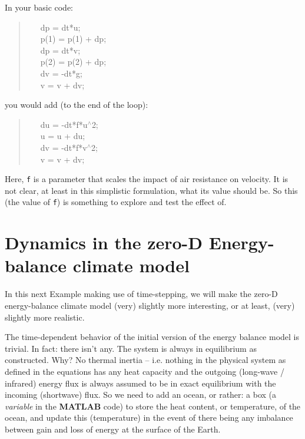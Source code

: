 \documentclass{tufte-book} %
\newenvironment{docspec}{\begin{quotation}\ttfamily\parskip0pt\parindent0pt\ignorespaces}{\end{quotation}}
\begin{document}
In your basic code:
\begin{docspec}
\ \ \ dp = dt*u;\\
\ \ \ p(1) = p(1) + dp;\\
\ \ \ dp = dt*v;\\
\ \ \ p(2) = p(2) + dp;\\
\ \ \ dv = -dt*g;\\
\ \ \ v = v + dv;
\end{docspec}
you would add (to the end of the loop):
\begin{docspec}
\ \ \ du = -dt*f*u\(^{\wedge}\)2;\\
\ \ \ u = u + du;\\
\ \ \ dv = -dt*f*v\(^{\wedge}\)2;\\
\ \ \ v = v + dv;
\end{docspec}

Here, \texttt{f} is a parameter that scales the impact of air resistance on velocity. It is not clear, at least in this simplistic formulation, what its value should be. So this (the value of \texttt{f}) is something to explore and test the effect of.


\newpage


\section{Dynamics in the zero-D Energy-balance climate model}

In this next Example making use of time-stepping, we will make the zero-D energy-balance climate model (very) slightly more interesting, or at least, (very) slightly more realistic.

The time-dependent behavior of the initial version of the energy balance model is trivial. In fact: there isn't any. The system is always in equilibrium as constructed. Why? No thermal inertia -- i.e. nothing in the physical system as defined in the equations  has  any heat capacity and the outgoing (long-wave / infrared) energy flux is always assumed to be in exact equilibrium with the incoming (shortwave) flux. So we need to add an ocean, or rather: a box (a \textit{variable} in the \textbf{MATLAB} code) to store the heat content, or temperature, of the ocean, and update this (temperature) in the event of there being any imbalance between gain and loss of energy at the surface of the Earth.
\end{document}
